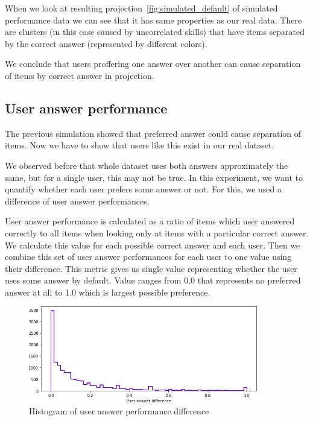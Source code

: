 \documentclass[
  print, %
  table,   %
  nolof,     %
  nolot,     %
  nocover,
  color,
  final,
]{fithesis3}
\begin{document}
When we look at resulting projection~\ref{fig:simulated_default} of simulated performance data we can see that it has same properties as our real data. There are clusters (in this case caused by uncorrelated skills) that have items separated by the correct answer (represented by different colors).

We conclude that users proffering one answer over another can cause separation of items by correct answer in projection.


\subsection{User answer performance}\label{user-answer-performance}


The previous simulation showed that preferred answer could cause separation of items. Now we have to show that users like this exist in our real dataset.

We observed before that whole dataset uses both answers approximately the same, but for a single user, this may not be true. In this experiment, we want to quantify whether each user prefers some answer or not. For this, we used a difference of user answer performances.

User answer performance is calculated as a ratio of items which user answered correctly to all items when looking only at items with a particular correct answer. We calculate this value for each possible correct answer and each user. Then we combine this set of user answer performances for each user to one value using their difference. This metric gives us single value representing whether the user uses some answer by default. Value ranges from 0.0 that represents no preferred answer at all to 1.0 which is largest possible preference.

\begin{figure}
  \includegraphics[width=10cm]{img/uneven_answers_hist}
  \caption{Histogram of user answer performance difference}
  \label{fig:uneven_answers_hist}
\end{figure}
\end{document}
